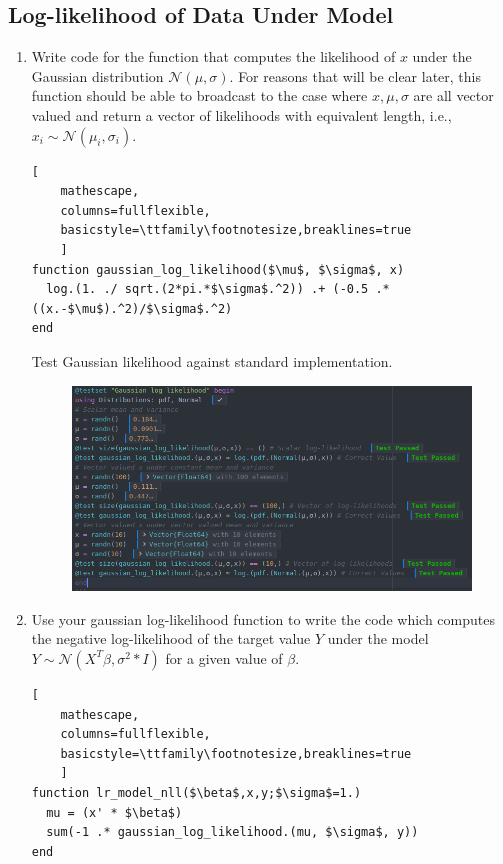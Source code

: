 \documentclass[12pt,letter]{article}
\begin{document}
\begin{enumerate}
\end{enumerate}

\pagebreak

\subsection{Log-likelihood of Data Under Model}
\begin{enumerate}
\item Write code for the function that computes the likelihood of $x$ under the Gaussian distribution $\mathcal{N}(\mu,\sigma)$. For reasons that will be clear later, this function should be able to broadcast to the case where $x, \mu, \sigma$ are all vector valued and return a vector of likelihoods with equivalent length, i.e., $x_i \sim \mathcal{N}(\mu_i,\sigma_i)$.
\begin{lstlisting}[
    mathescape,
    columns=fullflexible,
    basicstyle=\ttfamily\footnotesize,breaklines=true
    ]
function gaussian_log_likelihood($\mu$, $\sigma$, x)
  log.(1. ./ sqrt.(2*pi.*$\sigma$.^2)) .+ (-0.5 .* ((x.-$\mu$).^2)/$\sigma$.^2)
end
\end{lstlisting}

Test Gaussian likelihood against standard implementation.
\begin{figure}[h]
  \centering
  \includegraphics[width=16cm, keepaspectratio]{imgs/test2.png}
\end{figure}

\item Use your gaussian log-likelihood function to write the code which computes the negative log-likelihood of the target value $Y$ under the model $Y \sim \mathcal{N}(X^T\beta, \sigma^2*I)$ for a given value of $\beta$.
  
\begin{lstlisting}[
    mathescape,
    columns=fullflexible,
    basicstyle=\ttfamily\footnotesize,breaklines=true
    ]
function lr_model_nll($\beta$,x,y;$\sigma$=1.)
  mu = (x' * $\beta$)
  sum(-1 .* gaussian_log_likelihood.(mu, $\sigma$, y))
end
\end{lstlisting}


\end{enumerate}
\end{document}
